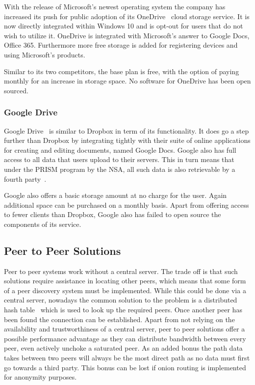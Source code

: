 With the release of Microsoft's newest operating system the company has increased its push for public adoption of its OneDrive~\cite{web:site:onedrive} cloud storage service.
It is now directly integrated within Windows 10 and is opt-out for users that do not wish to utilize it.
OneDrive is integrated with Microsoft's answer to Google Docs, Office 365.
Furthermore more free storage is added for registering devices and using Microsoft's products.

Similar to its two competitors, the base plan is free, with the option of paying monthly for an increase in storage space.
No software for OneDrive has been open sourced.

\subsubsection{Google Drive}
\label{subs:Google Drive}

Google Drive~\cite{web:site:gdrive} is similar to Dropbox in term of its functionality.
It does go a step further than Dropbox by integrating tightly with their suite of online applications for creating and editing documents, named Google Docs.
Google also has full access to all data that users upload to their servers.
This in turn means that under the PRISM program by the NSA, all such data is also retrievable by a fourth party~\cite{web:site:rt:google}.

Google also offers a basic storage amount at no charge for the user.
Again additional space can be purchased on a monthly basis.
Apart from offering access to fewer clients than Dropbox, Google also has failed to open source the components of its service.

\subsection{Peer to Peer Solutions}
\label{sub:Peer to Peer Solutions}

Peer to peer systems work without a central server.
The trade off is that such solutions require assistance in locating other peers, which means that some form of a peer discovery system must be implemented.
While this could be done via a central server, nowadays the common solution to the problem is a distributed hash table~\cite{ratnasamy2001scalable} which is used to look up the required peers.
Once another peer has been found the connection can be established.
Apart from not relying on the availability and trustworthiness of a central server, peer to peer solutions offer a possible performance advantage as they can distribute bandwidth between every peer, even actively unchoke a saturated peer.
As an added bonus the path data takes between two peers will always be the most direct path as no data must first go towards a third party.
This bonus can be lost if onion routing is implemented for anonymity purposes.

